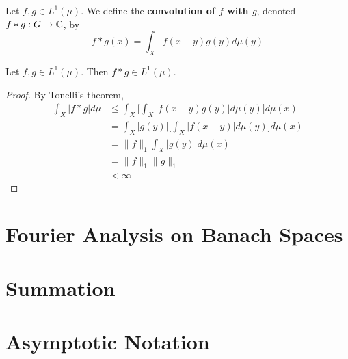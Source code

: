 \documentclass{book}
\begin{document}
	\begin{defn}  
	Let $f, g \in L^1(\mu)$. We define the \textbf{convolution of $f$ with $g$}, denoted $f * g: G \rightarrow \mathbb{C}$, by $$ f * g(x) = \int_X f(x-y)g(y) d\mu(y)$$
	\end{defn}
	
	\begin{ex}  
	Let $f, g \in L^1(\mu)$. Then $f * g \in L^1(\mu)$. 
	\end{ex}
	
	\begin{proof}
	By Tonelli's theorem, 
	\begin{align*}
	\int_X |f *g| d\mu 
	&\leq \int_X \bigg[  \int_X |f(x-y)g(y)| d\mu(y) \bigg] d\mu(x) \\
	&= \int_X |g(y)| \bigg[  \int_X |f(x-y)| d\mu(y) \bigg] d\mu(x) \\
	&=  \|f\|_1 \int_X |g(y)| d\mu(x) \\
	&= \|f\|_1 \|g\|_1\\
	& < \infty
	\end{align*}
	\end{proof}

























\newpage
\chapter{Fourier Analysis on Banach Spaces}
	
	
	

\appendix

\chapter{Summation}


\newpage	

\chapter{Asymptotic Notation}
\end{document}
